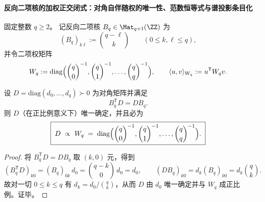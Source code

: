 \paragraph{反向二项核的加权正交闭式：对角自伴随权的唯一性、范数恒等式与谱投影条目化}

固定整数 \(q\ge 2\)。
记反向二项核 \(B_q\in \Mat_{q+1}(\ZZ)\) 为
\[
(B_q)_{k\ell}:=\binom{q-\ell}{k}\qquad(0\le k,\ell\le q),
\]
并令二项权矩阵
\[
W_q:=\mathrm{diag}\Bigl(\binom{q}{0}^{-1},\binom{q}{1}^{-1},\dots,\binom{q}{q}^{-1}\Bigr),
\qquad
\langle u,v\rangle_{W_q}:=u^{\mathsf T}W_qv.
\]

\begin{conclusion}\label{con:xi-bq-unique-diagonal-selfadjoint}
设 \(D=\mathrm{diag}(d_0,\dots,d_q)\succ 0\) 为对角矩阵并满足
\[
B_q^{\mathsf T}D=DB_q.
\]
则 \(D\)（在正比例意义下）唯一确定，并且必为
\[
\boxed{\;
D\ \propto\ W_q
\;=\;
\mathrm{diag}\Bigl(\binom{q}{0}^{-1},\binom{q}{1}^{-1},\dots,\binom{q}{q}^{-1}\Bigr).\;}
\]
\end{conclusion}
\begin{proof}
将 \(B_q^{\mathsf T}D=DB_q\) 取 \((k,0)\) 元，得到
\[
(B_q^{\mathsf T}D)_{k0}=(B_q)_{0k}\,d_0=\binom{q-k}{0}\,d_0=d_0,
\qquad
(DB_q)_{k0}=d_k(B_q)_{k0}=d_k\binom{q}{k}.
\]
故对一切 \(0\le k\le q\) 有 \(d_k=d_0/\binom{q}{k}\)，从而 \(D\) 由 \(d_0\) 唯一确定并与 \(W_q\) 成正比例。证毕。
\end{proof}

